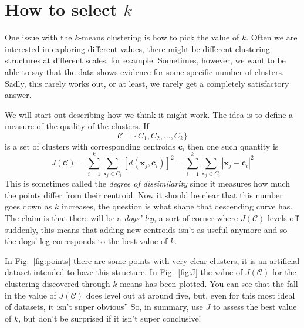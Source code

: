\documentclass[12pt]{article}
\begin{document}
\section*{How to select $k$}

One issue with the $k$-means clustering is how to pick the value of
$k$. Often we are interested in exploring different values, there
might be different clustering structures at different scales, for
example. Sometimes, however, we want to be able to say that the data
shows evidence for some specific number of clusters. Sadly, this rarely works out, or at least, we rarely get a completely satisfactory answer.

We will start out describing how we think it might work. The idea is
to define a measure of the quality of the clusters. If
\begin{equation}
  \mathcal{C}=\{C_1,C_2,\ldots,C_k\}
\end{equation}
is a set of clusters with corresponding centroids $\mathbf{c}_i$ then
one such quantity is
\begin{equation}
  J(\mathcal{C})=\sum_{i=1}^k\sum_{\mathbf{x}_j\in C_i}[d(\mathbf{x}_j,\mathbf{c}_i)]^2=\sum_{i=1}^k\sum_{\mathbf{x}_j\in C_i}|\mathbf{x}_j-\mathbf{c}_i|^2
\end{equation}
This is sometimes called the \textsl{degree of dissimilarity} since it
measures how much the points differ from their centroid. Now it should
be clear that this number goes down as $k$ increases, the question is
what shape that descending curve has. The claim is that there will be
a \textsl{dogs' leg}, a sort of corner where $J(\mathcal{C})$ levels
off suddenly, this means that adding new centroids isn't as useful
anymore and so the dogs' leg corresponds to the best value of $k$.

In Fig.~\ref{fig:points} there are some points with very clear
clusters, it is an artificial dataset intended to have this
structure. In Fig.~\ref{fig:J} the value of $J(\mathcal{C})$ for the
clustering discovered through $k$-means has been plotted. You can see that the fall in the value of $J(\mathcal{C})$ does level out at around five, but, even for this most ideal of datasets, it isn't super obvious''
So, in summary, use $J$ to assess the best value of $k$, but don't be surprised if it isn't super conclusive!
\end{document}
